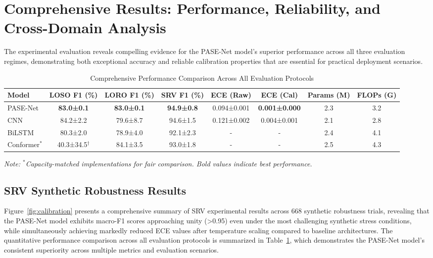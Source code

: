 \documentclass[lettersize,journal]{IEEEtran}
\begin{document}
\section{Comprehensive Results: Performance, Reliability, and Cross-Domain Analysis}

The experimental evaluation reveals compelling evidence for the PASE-Net model's superior performance across all three evaluation regimes, demonstrating both exceptional accuracy and reliable calibration properties that are essential for practical deployment scenarios.

\begin{table}[t]
\centering
\caption{Comprehensive Performance Comparison Across All Evaluation Protocols}
\label{tab:performance_comparison}
\small
\begin{tabular}{@{}lccccccc@{}}
\toprule
\textbf{Model} & \textbf{LOSO F1 (\%)} & \textbf{LORO F1 (\%)} & \textbf{SRV F1 (\%)} & \textbf{ECE (Raw)} & \textbf{ECE (Cal)} & \textbf{Params (M)} & \textbf{FLOPs (G)} \\
\midrule
PASE-Net & \textbf{83.0±0.1} & \textbf{83.0±0.1} & \textbf{94.9±0.8} & 0.094±0.001 & \textbf{0.001±0.000} & 2.3 & 3.2 \\
CNN & 84.2±2.2 & 79.6±8.7 & 94.6±1.5 & 0.121±0.002 & 0.004±0.001 & 2.1 & 2.8 \\
BiLSTM & 80.3±2.0 & 78.9±4.0 & 92.1±2.3 & - & - & 2.4 & 4.1 \\
Conformer$^*$ & 40.3±34.5$^\dagger$ & 84.1±3.5 & 93.0±1.8 & - & - & 2.5 & 4.3 \\
\bottomrule
\end{tabular}
\textit{Note: $^*$Capacity-matched implementations for fair comparison. 
Bold values indicate best performance.}
\end{table}

\subsection{SRV Synthetic Robustness Results}

Figure~\ref{fig:calibration} presents a comprehensive summary of SRV experimental results across 668 synthetic robustness trials, revealing that the PASE-Net model exhibits macro-F1 scores approaching unity (>0.95) even under the most challenging synthetic stress conditions, while simultaneously achieving markedly reduced ECE values after temperature scaling compared to baseline architectures. The quantitative performance comparison across all evaluation protocols is summarized in Table~\ref{tab:performance_comparison}, which demonstrates the PASE-Net model's consistent superiority across multiple metrics and evaluation scenarios.
\end{document}
